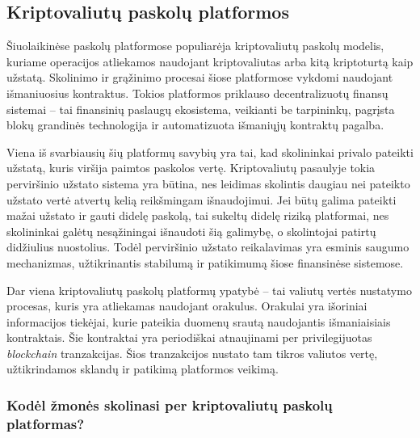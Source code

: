 \documentclass[]{VUMIFTemplateClass}
\begin{document}
\subsection{Kriptovaliutų paskolų platformos}
Šiuolaikinėse paskolų platformose populiarėja kriptovaliutų paskolų modelis, kuriame operacijos atliekamos naudojant kriptovaliutas arba kitą kriptoturtą kaip užstatą. Skolinimo ir grąžinimo procesai šiose platformose vykdomi naudojant išmaniuosius kontraktus. Tokios platformos priklauso decentralizuotų finansų sistemai – tai finansinių paslaugų ekosistema, veikianti be tarpininkų, pagrįsta blokų grandinės technologija ir automatizuota išmaniųjų kontraktų pagalba.

Viena iš svarbiausių šių platformų savybių yra tai, kad skolininkai privalo pateikti užstatą, kuris viršija paimtos paskolos vertę. Kriptovaliutų pasaulyje tokia perviršinio užstato sistema yra būtina, nes leidimas skolintis daugiau nei pateikto užstato vertė atvertų kelią reikšmingam išnaudojimui. Jei būtų galima pateikti mažai užstato ir gauti didelę paskolą, tai sukeltų didelę riziką platformai, nes skolininkai galėtų nesąžiningai išnaudoti šią galimybę, o skolintojai patirtų didžiulius nuostolius. Todėl perviršinio užstato reikalavimas yra esminis saugumo mechanizmas, užtikrinantis stabilumą ir patikimumą šiose finansinėse sistemose. \cite{whatisdefiliquidation}

Dar viena kriptovaliutų paskolų platformų ypatybė -- tai valiutų vertės nustatymo procesas, kuris yra atliekamas naudojant orakulus. Orakulai yra išoriniai informacijos tiekėjai, kurie pateikia duomenų srautą naudojantis išmaniaisiais kontraktais. Šie kontraktai yra periodiškai atnaujinami per privilegijuotas \textit{blockchain} tranzakcijas. Šios tranzakcijos nustato tam tikros valiutos vertę, užtikrindamos sklandų ir patikimą platformos veikimą.

\subsubsection{Kodėl žmonės skolinasi per kriptovaliutų paskolų platformas?}
\end{document}
